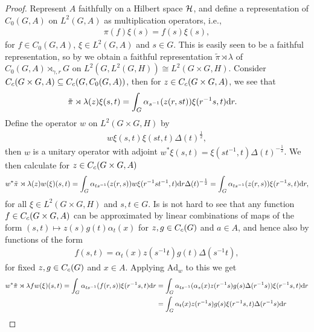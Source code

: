\begin{proof}
	 Represent $A$ faithfully on a Hilbert space $\mathcal{H}$, and define a representation of $C_0(G,A)$ on $L^2(G,A)$ as multiplication operators, i.e.,
	\begin{align*}
		\pi(f) \xi (s) = f(s)\xi(s), 
	\end{align*}
	for $f \in C_0(G,A)$, $\xi \in L^2(G,A)$ and $s \in G$. This is easily seen to be a faithful representation, so by  we obtain a faithful representation $\tilde \pi \rtimes \lambda$ of $C_0(G,A) \rtimes_{\gamma,r} G$ on $L^2(G,L^2(G,H)) \cong L^2(G \times G, H)$. Consider $C_c(G \times G,A) \subseteq C_c(G,C_0(G,A))$, then for $z \in C_c(G \times G, A)$, we see that
	\begin{align*}
		\tilde \pi \rtimes \lambda (z) \xi(s,t) &= \int_G \alpha_{s^{-1}}(z(r,st)) \xi(r^{-1}s,t) \mathrm{d} r.
	\end{align*}
	Define the operator $w$ on $L^2(G\times G,H)$ by
	\begin{align*}
		w \xi(s,t) \xi(st,t) \Delta(t)^{\frac12},
	\end{align*}
	then $w$ is a unitary operator with adjoint $w^* \xi(s,t) = \xi(st^{-1},t) \Delta(t)^{-\frac12}$. We then calculate for $z \in C_c(G \times G, A)$
	\begin{align*}
		w^*  \tilde \pi \rtimes \lambda (z) w (\xi) (s,t) = \int_G \alpha_{ts^{-1}} (z(r,s)) w \xi(r^{-1} s t^{-1},t) \mathrm{d} r \Delta(t)^{-\frac12} = \int_G \alpha_{ts^{-1}}(z(r,s)) \xi(r^{-1}s,t) \mathrm{d} r,
	\end{align*}
	for all $\xi \in L^2(G \times G, H)$ and $s,t \in G$. Is is not hard to see that any function $f \in C_c(G \times G , A)$ can be approximated by linear combinations of maps of the form $(s,t) \mapsto z(s)g(t)\alpha_t(x)$ for $z,g \in C_c(G)$ and $a \in A$, and hence also by functions of the form
	\begin{align*}
		f(s,t) = \alpha_{t}(x) z(s^{-1}t)g(t) \Delta(s^{-1}t),
	\end{align*}
	for fixed $z,g \in C_c(G)$ and $x \in A$. Applying $\mathrm{Ad}_{w}$ to this we get
	\begin{align*}
		w^* \tilde \pi \rtimes \lambda f w(\xi)(s,t) = \int_G \alpha_{ts^{-1}}(f(r,s)) \xi(r^{-1}s,t) \d r &= \int_G \alpha_{ts^{-1}}(\alpha_s(x) z(r^{-1}s)g(s) \Delta(r^{-1}s)) \xi(r^{-1}s,t) \d r \\
		&= \int_G \alpha_t(x) z(r^{-1}s) g(s) \xi(r^{-1}s,t) \Delta(r^{-1}s)  \d r\\

\end{align*}
\end{proof}
